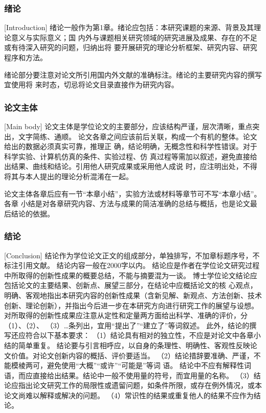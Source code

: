 \subsubsection{绪论}[Introduction]
绪论一般作为第1章。绪论应包括：本研究课题的来源、背景及其理论意义与实际意义；国
内外与课题相关研究领域的研究进展及成果、存在的不足或有待深入研究的问题，归纳出将
要开展研究的理论分析框架、研究内容、研究程序和方法。

绪论部分要注意对论文所引用国内外文献的准确标注。绪论的主要研究内容的撰写宜使用将
来时态，切忌将论文目录直接作为研究内容。

\subsubsection{论文主体}[Main body]
论文主体是学位论文的主要部分，应该结构严谨，层次清晰，重点突出，文字简练、通顺。
论文各章之间应该前后关联，构成一个有机的整体。论文给出的数据必须真实可靠，推理正
确，结论明确，无概念性和科学性错误。对于科学实验、计算机仿真的条件、实验过程、仿
真过程等需加以叙述，避免直接给出结果、曲线和结论。引用他人研究成果或采用他人成说
时，应注明出处，不得将其与本人提出的理论分析混淆在一起。

论文主体各章后应有一节“本章小结”，实验方法或材料等章节可不写“本章小结”。各章
小结是对各章研究内容、方法与成果的简洁准确的总结与概括，也是论文最后结论的依据。

\subsubsection{结论}[Conclusion]
结论作为学位论文正文的组成部分，单独排写，不加章标题序号，不标注引用文献。
结论内容一般在\num{2000}字以内。
结论应是作者在学位论文研究过程中所取得的创新性成果的概要总结，不能与摘要混为一谈。
博士学位论文结论应包括论文的主要结果、创新点、展望三部分，在结论中应概括论文的核
心观点，明确、客观地指出本研究内容的创新性成果（含新见解、新观点、方法创新、技术
创新、理论创新），并指出今后进一步在本研究方向进行研究工作的展望与设想。
对所取得的创新性成果应注意从定性和定量两方面给出科学、准确的评价，分（1）、（2）、
（3）…条列出，宜用“提出了”“建立了”等词叙述。
此外，结论的撰写还应符合以下基本要求：
（1）结论具有相对的独立性，不应是对论文中各章小结的简单重复。
结论要与引言相呼应，以自身的条理性、明确性、客观性反映论文价值。对论文创新内容的概括、评价要适当。
（2）结论措辞要准确、严谨，不能模棱两可，避免使用“大概”“或许”“可能是”等词
语。
结论中不应有解释性词语，而应直接给出结果。结论中一般不使用量的符号，而宜用量的名称。
（3）结论应指出论文研究工作的局限性或遗留问题，如条件所限，或存在例外情况，或本论文尚难以解释或解决的问题。
（4）常识性的结果或重复他人的结果不应作为结论。

